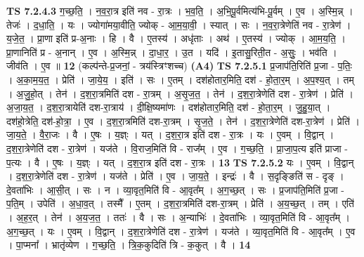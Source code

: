 \documentclass[17pt]{extarticle}
\begin{document}
                  \newline
                                \textbf{ TS 7.2.4.3} \newline
                  ग॒च्छ॒ति॒ । न॒व॒रा॒त्र इति॑ नव - रा॒त्रः । भ॒व॒ति॒ । अ॒भि॒पू॒र्वमित्य॑भि-पू॒र्वम् । ए॒व । अ॒स्मि॒न्न् । तेजः॑ । द॒धा॒ति॒ । यः । ज्योगा॑मया॒वीति॒ ज्योक् - आ॒म॒या॒वी॒ । स्यात् । सः । न॒व॒रा॒त्रेणेति॑ नव - रा॒त्रेण॑ । य॒जे॒त॒ । प्रा॒णा इति॑ प्र-अ॒नाः । हि । वै । ए॒तस्य॑ । अधृ॑ताः । अथ॑ । ए॒तस्य॑ । ज्योक् । आ॒म॒य॒ति॒ । प्रा॒णानिति॑ प्र - अ॒नान् । ए॒व । अ॒स्मि॒न्न् । दा॒धा॒र॒ । उ॒त । यदि॑ । इ॒तासु॒रिती॒त - अ॒सुः॒ । भव॑ति । जीव॑ति । ए॒व ॥ \textbf{  12} \newline
                  \newline
                      (कल्प॑न्ते-प्र॒जनां॒ - त्रय॑स्त्रिꣳशच्च)  \textbf{(A4)} \newline \newline
                                \textbf{ TS 7.2.5.1} \newline
                  प्र॒जाप॑ति॒रिति॑ प्र॒जा - प॒तिः॒ । अ॒का॒म॒य॒त॒ । प्रेति॑ । जा॒ये॒य॒ । इति॑ । सः । ए॒तम् । दश॑होतार॒मिति॒ दश॑ - हो॒ता॒र॒म् । अ॒प॒श्य॒त् । तम् । अ॒जु॒हो॒त् । तेन॑ । द॒श॒रा॒त्रमिति॑ दश - रा॒त्रम् । अ॒सृ॒ज॒त॒ । तेन॑ । द॒श॒रा॒त्रेणेति॑ दश - रा॒त्रेण॑ । प्रेति॑ । अ॒जा॒य॒त॒ । द॒श॒रा॒त्रायेति॑ दश-रा॒त्राय॑ । दी॒क्षि॒ष्यमा॑णः । दश॑होतार॒मिति॒ दश॑ - हो॒ता॒र॒म् । जु॒हु॒या॒त् । दश॑हो॒त्रेति॒ दश॑-हो॒त्रा॒ । ए॒व । द॒श॒रा॒त्रमिति॑ दश-रा॒त्रम् । सृ॒ज॒ते॒ । तेन॑ । द॒श॒रा॒त्रेणेति॑ दश-रा॒त्रेण॑ । प्रेति॑ । जा॒य॒ते॒ । वै॒रा॒जः । वै । ए॒षः । य॒ज्ञ्ः । यत् । द॒श॒रा॒त्र इति॑ दश - रा॒त्रः । यः । ए॒वम् । वि॒द्वान् । द॒श॒रा॒त्रेणेति॑ दश - रा॒त्रेण॑ । यज॑ते । वि॒राज॒मिति॑ वि - राज᳚म् । ए॒व । ग॒च्छ॒ति॒ । प्रा॒जा॒प॒त्य इति॑ प्राजा - प॒त्यः । वै । ए॒षः । य॒ज्ञ्ः । यत् । द॒श॒रा॒त्र इति॑ दश - रा॒त्रः । \textbf{  13} \newline
                  \newline
                                \textbf{ TS 7.2.5.2} \newline
                  यः । ए॒वम् । वि॒द्वान् । द॒श॒रा॒त्रेणेति॑ दश - रा॒त्रेण॑ । यज॑ते । प्रेति॑ । ए॒व । जा॒य॒ते॒ । इन्द्रः॑ । वै । स॒दृङ्ङिति॑ स - दृङ् । दे॒वता॑भिः । आ॒सी॒त् । सः । न । व्या॒वृत॒मिति॑ वि - आ॒वृत᳚म् । अ॒ग॒च्छ॒त् । सः । प्र॒जाप॑ति॒मिति॑ प्र॒जा - प॒ति॒म् । उपेति॑ । अ॒धा॒व॒त् । तस्मै᳚ । ए॒तम् । द॒श॒रा॒त्रमिति॑ दश-रा॒त्रम् । प्रेति॑ । अ॒य॒च्छ॒त् । तम् । एति॑ । अ॒ह॒र॒त् । तेन॑ । अ॒य॒ज॒त॒ । ततः॑ । वै । सः । अ॒न्याभिः॑ । दे॒वता॑भिः । व्या॒वृत॒मिति॑ वि - आ॒वृत᳚म् । अ॒ग॒च्छ॒त् । यः । ए॒वम् । वि॒द्वान् । द॒श॒रा॒त्रेणेति॑ दश - रा॒त्रेण॑ । यज॑ते । व्या॒वृत॒मिति॑ वि - आ॒वृत᳚म् । ए॒व । पा॒प्मना᳚ । भ्रातृ॑व्येण । ग॒च्छ॒ति॒ । त्रि॒क॒कुदिति॑ त्रि - क॒कुत् । वै । \textbf{  14} \newline
\end{document}
